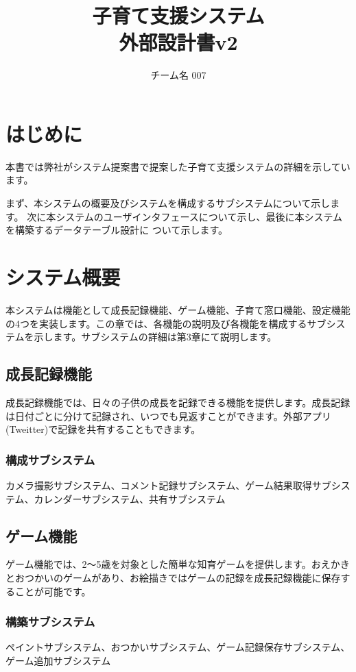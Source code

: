 \documentclass[a4j]{jarticle}
\title{
\vspace{30mm}
{\bf 子育て支援システム}
\\
\vspace{5mm}
{\bf 外部設計書v2\\
}
\vspace{120mm}
}
\author{
\vspace{5mm}
チーム名 007\\
\vspace{5mm}
}
\begin{document}
\maketitle
\tableofcontents
\newpage

\section{はじめに}
本書では弊社がシステム提案書で提案した子育て支援システムの詳細を示しています。

まず、本システムの概要及びシステムを構成するサブシステムについて示します。
次に本システムのユーザインタフェースについて示し、最後に本システムを構築するデータテーブル設計に
ついて示します。

\section{システム概要}
本システムは機能として成長記録機能、ゲーム機能、子育て窓口機能、設定機能の4つを実装します。この章では、各機能の説明及び各機能を構成するサブシステムを示します。サブシステムの詳細は第3章にて説明します。

\subsection{成長記録機能}
成長記録機能では、日々の子供の成長を記録できる機能を提供します。成長記録は日付ごとに分けて記録され、いつでも見返すことができます。外部アプリ(Tweitter)で記録を共有することもできます。
\subsubsection*{構成サブシステム}
\noindent カメラ撮影サブシステム、コメント記録サブシステム、ゲーム結果取得サブシステム、カレンダーサブシステム、共有サブシステム

\subsection{ゲーム機能}
ゲーム機能では、2〜5歳を対象とした簡単な知育ゲームを提供します。おえかきとおつかいのゲームがあり、お絵描きではゲームの記録を成長記録機能に保存することが可能です。
\subsubsection*{構築サブシステム}
\noindent ペイントサブシステム、おつかいサブシステム、ゲーム記録保存サブシステム、ゲーム追加サブシステム
\end{document}
